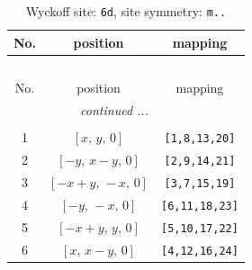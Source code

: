 \documentclass[fleqn,8pt]{jsarticle}
\begin{document}
\renewcommand{\arraystretch}{1.2}
\begin{longtable}{ccc}
\caption{Wyckoff site: {\tt 6d}, site symmetry: {\tt m..}}
 \\
 \hline \hline
No. & position & mapping \\ \hline \endfirsthead

\multicolumn{2}{l}{\tablename\ \thetable{}} \\
 \hline \hline
No. & position & mapping \\ \hline \endhead

 \hline \hline
\multicolumn{2}{r}{\footnotesize\it continued ...} \\ \endfoot

 \hline \hline
\multicolumn{2}{r}{} \\ \endlastfoot

1 & $\left[ x,\, y,\, 0 \right]$ & {\tt [1,8,13,20]} \\ \hline
2 & $\left[ - y,\, x - y,\, 0 \right]$ & {\tt [2,9,14,21]} \\ \hline
3 & $\left[ - x + y,\, - x,\, 0 \right]$ & {\tt [3,7,15,19]} \\ \hline
4 & $\left[ - y,\, - x,\, 0 \right]$ & {\tt [6,11,18,23]} \\ \hline
5 & $\left[ - x + y,\, y,\, 0 \right]$ & {\tt [5,10,17,22]} \\ \hline
6 & $\left[ x,\, x - y,\, 0 \right]$ & {\tt [4,12,16,24]} \\
\end{longtable}
\renewcommand{\arraystretch}{1.2}
\end{document}
